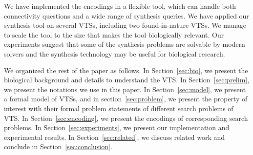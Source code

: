 %

%
%


\par We have implemented the encodings in a flexible tool, which can handle both connectivity questions and a wide range of synthesis queries. 
%
We have applied our synthesis tool on several VTSs, including
two found-in-nature VTSs.
%
We manage to scale the tool to the size that makes the tool biologically relevant. 
%
Our experiments suggest that some of the synthesis problems are solvable by modern solvers and the synthesis technology may be useful for biological research.
%

%
We organized the rest of the paper as follows. 
%
In Section~\ref{sec:bio}, we present the biological background and details to understand the VTS. 
%
In Section~\ref{sec:prelim}, we present the notations we use in this paper. 
%
In Section~\ref{sec:model}, we present a formal model of VTSs, and in section~\ref{sec:problem}, we present the property of interest with their formal problem statements of different search problems of VTS.
%
In Section~\ref{sec:encoding}, we present the encodings of corresponding search problems. 
%
In Section~\ref{sec:experiments}, we present our implementation and experimental results. 
%
In Section~\ref{sec:related}, we discuss related work and conclude in Section~\ref{sec:conclusion}.
%
~        
